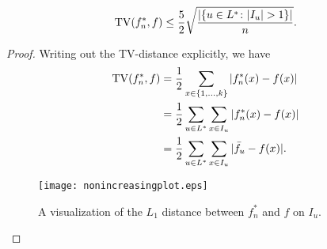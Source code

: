 \begin{prop}
  \[
    \operatorname{TV}(f^*_n, f) \le \frac{5}{2} \sqrt{\frac{|\{u \in L^* \colon |I_u| > 1\} |}{n}} .
  \]
\end{prop}
\begin{proof}
  Writing out the TV-distance explicitly, we have
  \begin{align*}
    \TV(f^*_n, f) &= \frac{1}{2} \sum_{x \in \{1, \dots, k\}} |f^*_n(x) - f(x)| \\
                  &= \frac{1}{2} \sum_{u \in L^*} \sum_{x \in I_u} |f^*_n(x) - f(x)| \\
                  &= \frac{1}{2} \sum_{u \in L^*} \sum_{x \in I_u} | \bar{f}_u - f(x) | .
  \end{align*}
  \begin{figure} 
    \centering
    \texttt{[image: nonincreasingplot.eps]}
    \caption{A visualization of the $L_1$ distance between $f^*_n$ and
      $f$ on $I_u$.}
  \end{figure}
  

\end{proof}
